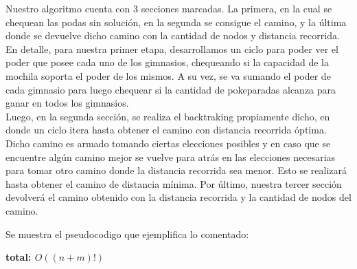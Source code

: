 Nuestro algoritmo cuenta con 3 secciones marcadas. La primera, en la cual se chequean las podas sin soluci\'on, en la segunda se consigue el camino, y la \'ultima donde se devuelve dicho camino con la cantidad de nodos y distancia recorrida.\\
En detalle, para nuestra primer etapa, desarrollamos un ciclo para poder ver el poder que posee cada uno de los gimnasios, chequeando si la capacidad de la mochila soporta el poder de los mismos. A su vez, se va sumando el poder de cada gimnasio para luego chequear si la cantidad de pokeparadas alcanza para ganar en todos los gimnasios.\\
Luego, en la segunda secci\'on, se realiza el backtraking propiamente dicho, en donde un ciclo itera hasta obtener el camino con distancia recorrida \'optima. Dicho camino es armado tomando ciertas elecciones posibles y en caso que se encuentre alg\'un camino mejor se vuelve para atrás en las elecciones necesarias para tomar otro camino donde la distancia recorrida sea menor. Esto se realizar\'a hasta obtener el camino de distancia m\'inima.
Por \'ultimo, nuestra tercer secci\'on devolver\'a el camino obtenido con la distancia recorrida y la cantidad de nodos del camino.

Se muestra el pseudocodigo que ejemplifica lo comentado:

\begin{algorithm}[H]
		
		\textbf{\hfill total: $O((n+m)!)$}\\
\end{algorithm}

